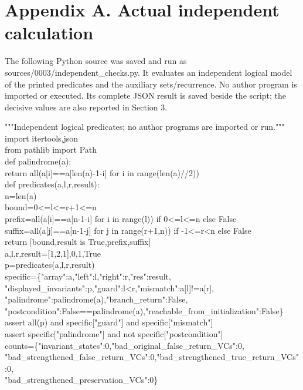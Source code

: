\documentclass[10pt]{article}
\begin{document}
\section*{Appendix A. Actual independent calculation}
The following Python source was saved and run as sources/0003/independent\_checks.py. It evaluates an independent logical model of the printed predicates and the auxiliary sets/recurrence. No author program is imported or executed. Its complete JSON result is saved beside the script; the decisive values are also reported in Section 3.\par
{\ttfamily\footnotesize """Independent logical predicates; no author programs are imported or run."""\\
import itertools,json\\
from pathlib import Path\\
def palindrome(a):\\
    return all(a[i]==a[len(a)-1-i] for i in range(len(a)//2))\\
def predicates(a,l,r,result):\\
    n=len(a)\\
    bound=0<=l<=r+1<=n\\
    prefix=all(a[i]==a[n-1-i] for i in range(l)) if 0<=l<=n else False\\
    suffix=all(a[j]==a[n-1-j] for j in range(r+1,n)) if -1<=r<n else False\\
    return [bound,result is True,prefix,suffix]\\
a,l,r,result=[1,2,1],0,1,True\\
p=predicates(a,l,r,result)\\
specific=\{"array":a,"left":l,"right":r,"res":result,\\
 "displayed\_invariants":p,"guard":l<r,"mismatch":a[l]!=a[r],\\
 "palindrome":palindrome(a),"branch\_return":False,\\
 "postcondition":False==palindrome(a),"reachable\_from\_initialization":False\}\\
assert all(p) and specific["guard"] and specific["mismatch"]\\
assert specific["palindrome"] and not specific["postcondition"]\\
counts=\{"invariant\_states":0,"bad\_original\_false\_return\_VCs":0,\\
        "bad\_strengthened\_false\_return\_VCs":0,"bad\_strengthened\_true\_return\_VCs":0,\\
        "bad\_strengthened\_preservation\_VCs":0\}\\
}
\end{document}
